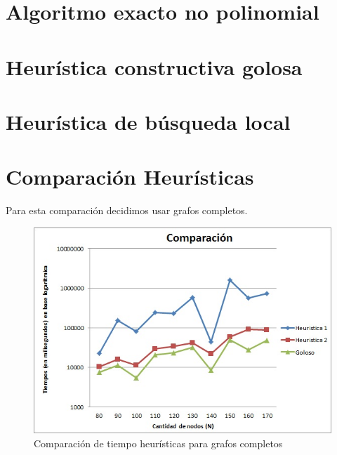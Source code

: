 \documentclass[a4paper]{article}
\begin{document}
\newpage
\section{Algoritmo exacto no polinomial}


\newpage
\section{Heurística constructiva golosa}


\newpage
\section{Heurística de búsqueda local}


\section{Comparación Heurísticas}

Para esta comparación decidimos usar grafos completos.

\begin{figure}[H]
  \begin{center}
      \includegraphics[scale=0.75]{../Ejercicio5.jpg}
  \end{center}
  \caption{Comparación de tiempo heurísticas para grafos completos}
  \label{prom}
\end{figure}
\end{document}

